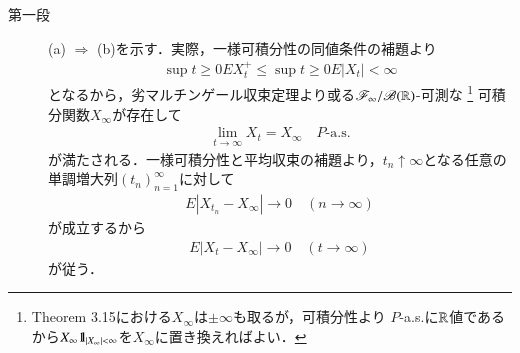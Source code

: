 	\begin{prf}\mbox{}
		\begin{description}
			\item[第一段]
				(a) $\Rightarrow$ (b)を示す．実際，一様可積分性の同値条件の補題より
				\begin{align}
					\sup{t \geq 0}{EX_t^+} \leq \sup{t \geq 0}{E|X_t|} < \infty
				\end{align}
				となるから，劣マルチンゲール収束定理より或る$\mathscr{F}_\infty/\mathscr{B}(\mathbb{R})$-可測な
				\footnote{
					Theorem 3.15における$X_\infty$は$\pm \infty$も取るが，可積分性より
					$P$-a.s.に$\mathbb{R}$値であるから$X_\infty \mbox{1}\hspace{-0.25em}\mbox{l}_{|X_\infty|<\infty}$を$X_\infty$に置き換えればよい．
				}
				可積分関数$X_\infty$が存在して
				\begin{align}
					\lim_{t \to \infty} X_t = X_\infty
					\quad \mbox{$P$-a.s.}
				\end{align}
				が満たされる．一様可積分性と平均収束の補題より，$t_n \uparrow \infty$となる任意の単調増大列$(t_n)_{n=1}^\infty$に対して
				\begin{align}
					E|X_{t_n} - X_\infty| \longrightarrow 0
					\quad (n \longrightarrow \infty)
				\end{align}
				が成立するから
				\begin{align}
					E|X_t - X_\infty| \longrightarrow 0
					\quad (t \longrightarrow \infty)
				\end{align}
				が従う．
			

\end{description}
\end{prf}
